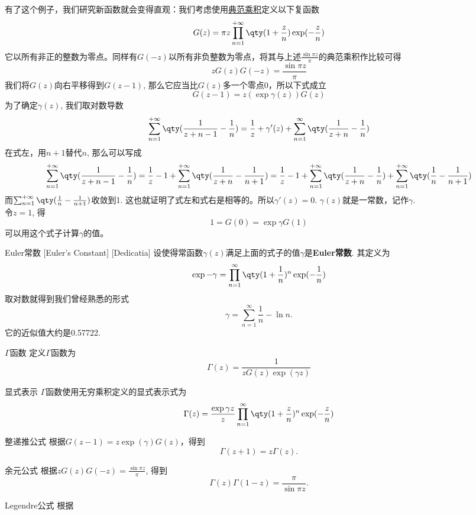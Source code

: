 \documentclass[UTF8]{ctexart}
\begin{document}
有了这个例子，我们研究新函数就会变得直观：我们考虑使用\hyperref[dfn:CanonicalProduct]{典范乘积}定义以下复函数
\[G(z)=\pi z\prod_{n=1}^{+\infty}\qty(1+\frac{z}{n})\exp(-\frac{z}{n})\]
它以所有非正的整数为零点。同样有$G(-z)$以所有非负整数为零点，将其与上述$\frac{\sin\pi z}{\pi}$的典范乘积作比较可得
\[zG(z)G(-z)=\frac{\sin\pi z}{\pi}\]
我们将$G(z)$向右平移得到$G(z-1)$, 那么它应当比$G(z)$多一个零点0，所以下式成立
\[G(z-1)=z(\exp\gamma(z))G(z)\]
为了确定$\gamma(z)$, 我们取对数导数
\[\sum_{n=1}^{+\infty}\qty(\frac{1}{z+n-1}-\frac{1}{n})=\frac{1}{z}+\gamma'(z)+\sum_{n=1}^{\infty}\qty(\frac{1}{z+n}-\frac{1}{n})\]
在式左，用$n+1$替代$n$, 那么可以写成
\[\sum_{n=1}^{+\infty}\qty(\frac{1}{z+n-1}-\frac{1}{n})=\frac{1}{z}-1+\sum_{n=1}^{+\infty}\qty(\frac{1}{z+n}-\frac{1}{n+1})=\frac{1}{z}-1+\sum_{n=1}^{+\infty}\qty(\frac{1}{z+n}-\frac{1}{n})+\sum_{n=1}^{+\infty}\qty(\frac{1}{n}-\frac{1}{n+1})\]
而$\sum_{n=1}^{+\infty}\qty(\frac{1}{n}-\frac{1}{n+1})$收敛到1. 这也就证明了式左和式右是相等的。所以$\gamma'(z)=0$. $\gamma(z)$就是一常数，记作$\gamma$.\\
令$z=1$, 得
\[1=G(0)=\exp\gamma G(1)\]
可以用这个式子计算$\gamma$的值。
\begin{dfn}
    [EulerConstant]
    {Euler常数}
    [Euler's Constant]
    [Dedicatia]
    设使得常函数$\gamma(z)$满足上面的式子的值$\gamma$是\textbf{Euler常数}. 其定义为
    \[\exp -\gamma=\prod_{n=1}^{\infty}\qty(1+\frac{1}{n})^n\exp(-\frac{1}{n})\]
    取对数就得到我们曾经熟悉的形式
    \[\gamma=\sum_{n=1}^{\infty}\frac{1}{n}-\ln n.\]
    它的近似值大约是0.57722.
\end{dfn}
\begin{dfn}
    {$\Gamma$函数}
    定义$\Gamma$函数为
    \[\Gamma(z)=\frac{1}{zG(z)\exp(\gamma z)}\]
\end{dfn}
\begin{dfn}
    {显式表示}
    $\Gamma$函数使用无穷乘积定义的显式表示式为
    \[\Gamma(z)=\frac{\exp\gamma z}{z}\prod_{n=1}^{\infty}\qty(1+\frac{z}{n})^n\exp(-\frac{z}{n})\]
\end{dfn}
\begin{ppt}
    {整递推公式}
    根据$G(z-1)=z\exp(\gamma)G(z)$，得到
    \[\Gamma(z+1)=z\Gamma(z).\]
\end{ppt}
\begin{ppt}
    {余元公式}
    根据$zG(z)G(-z)=\frac{\sin\pi z}{\pi}$, 得到
    \[\Gamma(z)\Gamma(1-z)=\frac{\pi}{\sin\pi z}.\]
\end{ppt}
\begin{ppt}
    {Legendre公式}
    根据
\end{ppt}
\end{document}
